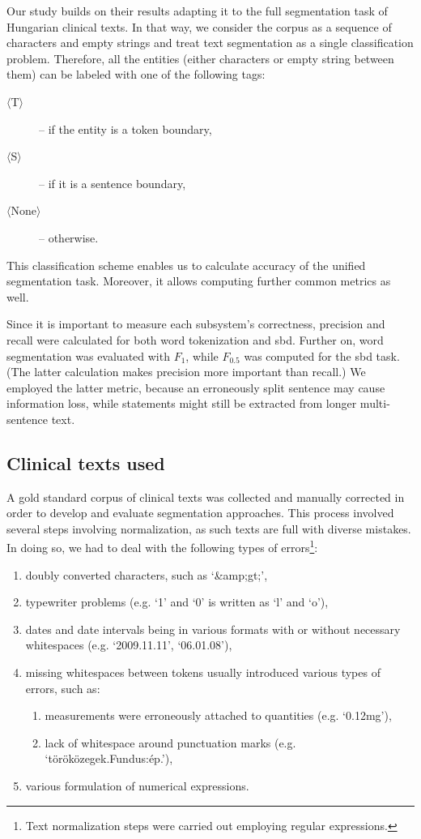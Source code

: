 Our study builds on their results \cite{read2012sentence} adapting it to the full segmentation task of Hungarian clinical texts. 
In that way, we consider the corpus as a sequence of characters and empty strings and treat text segmentation as a single classification problem. 
Therefore, all the entities (either characters or empty string between them) can be labeled with one of the following tags: 
\begin{description}
 \item[$\langle$T$\rangle$] --  if the entity is a token boundary,
 \item[$\langle$S$\rangle$] -- if it is a sentence boundary,
 \item[$\langle$None$\rangle$] -- otherwise.
\end{description}
This classification scheme enables us to calculate accuracy of the unified segmentation task. 
Moreover, it allows computing further common metrics as well.

Since it is important to measure each subsystem's correctness, precision and recall were calculated for both word tokenization and \acrlong{sbd}. 
Further on, word segmentation was evaluated with $F_1$, while $F_{0.5}$ was computed for the \acrshort{sbd} task. 
(The latter calculation makes precision more important than recall.)
We employed the latter metric, because an erroneously split sentence may cause information loss\label{sec:loss}, while statements might still be extracted from longer multi-sentence text. 

\subsection{Clinical texts used}
\label{sec:clin_corpus}

A gold standard corpus of clinical texts was collected and manually corrected in order to develop and evaluate segmentation approaches.
This process involved several steps involving normalization, as such texts are full with diverse mistakes. 
In doing so, we had to deal with the following types of errors\footnote{Text normalization steps were carried out employing regular expressions.}:
\begin{enumerate}
 \item doubly converted characters, such as `\&amp;gt;',
 \item typewriter problems (e.g. `1' and `0' is written as `l' and `o'),
 \item dates and date intervals being in various formats with or without necessary whitespaces (e.g. `2009.11.11', `06.01.08'),
 \item missing whitespaces between tokens usually introduced various types of errors, such as:
 \begin{enumerate}
  \item measurements were erroneously attached to quantities (e.g. `0.12mg'),
  \item lack of whitespace around punctuation marks (e.g. `töröközegek.Fundus:ép.'),
 \end{enumerate}
 \item various formulation of numerical expressions.
\end{enumerate}
 
